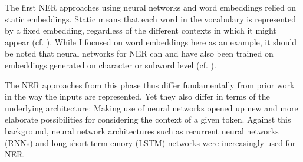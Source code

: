 The first NER approaches using neural networks and word embeddings relied on static embeddings. Static means that each word in the vocabulary is represented by a fixed embedding, regardless of the different contexts in which it might appear (cf. \cite[18]{jurafsky_2021_6}). While I focused on word embeddings here as an example, it should be noted that neural networks for NER can and have also been trained on embeddings generated on character or subword level (cf. \cite{yadav_survey_2019}). 

The NER approaches from this phase thus differ fundamentally from prior work in the way the inputs are represented. Yet they also differ in terms of the underlying architecture: Making use of neural networks opened up new and more elaborate possibilities for considering the context of a given token. Against this background, neural network architectures such as recurrent neural networks (RNNs) and long short-term emory (LSTM) networks were increasingly used for NER. 



%
%

